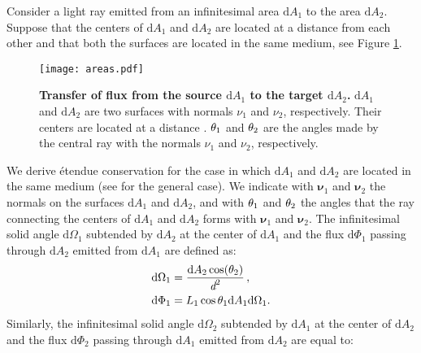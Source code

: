 Consider a light ray emitted from an infinitesimal area $\textrm{d}A_1$ to the area $\textrm{d}A_2$. Suppose that the centers of $\textrm{d}A_1$ and $\textrm{d}A_2$ 
are located at a distance  from each other and that both the surfaces are located in the same medium, see Figure \ref{fig:etendue_conservation}.
\begin{figure}[t]
 \label{fig:etendue_conservation}
     \begin{center}
     \texttt{[image: areas.pdf]}
     \end{center}
     \caption{\textbf{Transfer of flux from the source $\textrm{d}A_1$ to the target $\textrm{d}A_2$.} $\textrm{d}A_1$ and $\textrm{d}A_2$ are two surfaces with normals $\nu_1$ and $\nu_2$, respectively. Their centers are located at a distance .
$\theta_1$ and $\theta_2$ are the angles made by the central ray with the normals $\nu_1$ and $\nu_2$, respectively.}
\label{fig:etendue_conservation}
 \end{figure}
We derive \'{e}tendue conservation for the case in which $\textrm{d}A_1$ and $\textrm{d}A_2$ are located in the same medium (see \cite{chaves2015introduction, koshel2012illumination} for the general case).
We indicate with $\boldsymbol{\nu}_1$ and $\boldsymbol{\nu}_2$ the normals on the surfaces $\textrm{d}A_1$ and $\textrm{d}A_2$, and with $\theta_1$ and $\theta_2$ the angles that the ray connecting the centers of $\textrm{d}A_1$ and $\textrm{d}A_2$ forms with $\boldsymbol{\nu}_1$ and $\boldsymbol{\nu}_2$. The infinitesimal solid angle $\textrm{d}\Omega_1$ subtended by $\textrm{d}A_2$ at the center of $\textrm{d}A_1$ and the flux $\textrm{d}\Phi_1$ passing through $\textrm{d}A_2$ emitted from $\textrm{d}A_1$ are defined as:
\begin{subequations}
\begin{align}
\label{eq:omega1}
\textrm{d}\Omega_1 &= \frac{\textrm{d}A_2\cos(\theta_2)}{\textit{d}^2}\,,\\
\textrm{d}\Phi_1 &= L_1 \cos\theta_1 \textrm{d}A_1 \textrm{d}\Omega_1. \label{eq:phi1}
\end{align}
\end{subequations}
Similarly, the infinitesimal solid angle $\textrm{d}\Omega_2$ subtended by $\textrm{d}A_1$ at the center of $\textrm{d}A_2$ and the flux $\textrm{d}\Phi_2$ passing through $\textrm{d}A_1$ emitted from $\textrm{d}A_2$ are equal to:
